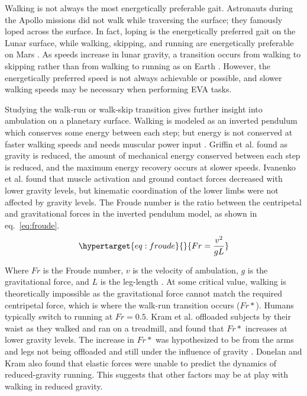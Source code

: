 \documentclass[defaultstyle,11pt]{comps}
\begin{document}
Walking is not always the most energetically preferable gait.
Astronauts during the Apollo missions did not walk while traversing the surface; they famously loped across the surface.
In fact, loping is the energetically preferred gait on the Lunar surface, while walking, skipping, and running are energetically preferable on Mars \citep{Ackermann2012b}.
As speeds increase in lunar gravity, a transition occurs from walking to skipping rather than from walking to running as on Earth \citep{Minetti2012}.
However, the energetically preferred speed is not always achievable or possible, and slower walking speeds may be necessary when performing EVA tasks.

Studying the walk-run or walk-skip transition gives further insight into ambulation on a planetary surface.
Walking is modeled as an inverted pendulum which conserves some energy between each step; but energy is not conserved at faster walking speeds and needs muscular power input \citep{Cavagna1976, Cavagna1977}.
Griffin et al. \citep{Griffin1999} found as gravity is reduced, the amount of mechanical energy conserved between each step is reduced, and the maximum energy recovery occurs at slower speeds.
Ivanenko et al. \citep{Ivanenko2002} found that muscle activation and ground contact forces decreased with lower gravity levels, but kinematic coordination of the lower limbs were not affected by gravity levels.
The Froude number is the ratio between the centripetal and gravitational forces in the inverted pendulum model, as shown in eq.~\ref{eq:froude}.
\begin{equation}\protect\hypertarget{eq:froude}{}{
Fr=\frac{v^{2}}{gL}
}\label{eq:froude}\end{equation}

Where \(Fr\) is the Froude number, \(v\) is the velocity of ambulation, \(g\) is the gravitational force, and \(L\) is the leg-length \citep{AlexanderMcN.1989}.
At some critical value, walking is theoretically impossible as the gravitational force cannot match the required centripetal force, which is where the walk-run transition occurs (\(Fr*\)).
Humans typically switch to running at \(Fr=0.5\).
Kram et al. \citep{Kram1997} offloaded subjects by their waist as they walked and ran on a treadmill, and found that \(Fr*\) increases at lower gravity levels.
The increase in \(Fr*\) was hypothesized to be from the arms and legs not being offloaded and still under the influence of gravity \citep{Kram1997}.
Donelan and Kram \citep{Donelan2000} also found that elastic forces were unable to predict the dynamics of reduced-gravity running.
This suggests that other factors may be at play with walking in reduced gravity.
\end{document}
